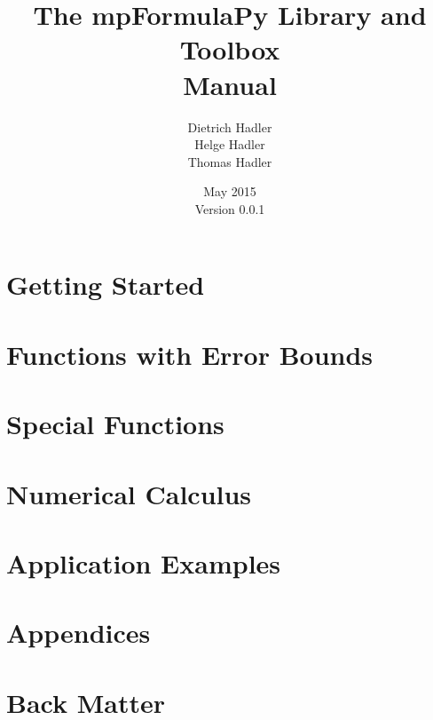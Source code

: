 \documentclass[12pt,a4paper,openany]{book}
\numberwithin{equation}{section}
\begin{document}
\begin{titlepage}
\author{
Dietrich Hadler\\
Helge Hadler\\
Thomas Hadler
} 
\title{The mpFormulaPy Library and Toolbox\\[0.2cm]
 Manual} 
\date{May 2015 \\ 
Version {0.0.1}}
\maketitle
\end{titlepage}

\thispagestyle{empty}

\setcounter{page}{1}
\frontmatter
\maketitle

\setlength{\parindent}{0pt}



\tableofcontents
\listoftables
\listoffigures

\mainmatter
\setlength{\parindent}{0pt}

\part{Getting Started}



\part{Functions with Error Bounds}



\part{Special Functions}



\part{Numerical Calculus}



\part{Application Examples}



\part{Appendices}
\begin{appendices}

\end{appendices}


\part{Back Matter}
\backmatter
 
 
\printnomenclature[1.2in]
\printindex
\end{document}
